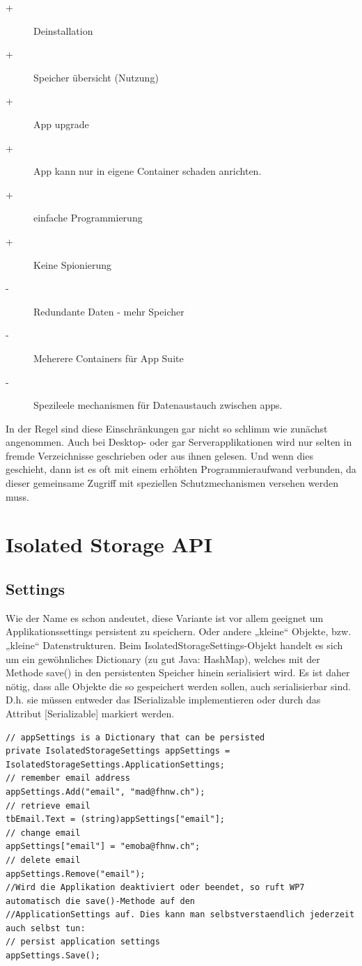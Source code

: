 \documentclass[a4paper,10pt]{scrreprt}
\begin{document}
\begin{description}
 \item [+] Deinstallation
 \item[+] Speicher übersicht (Nutzung)
 \item[+] App upgrade
 \item[+] App kann nur in eigene Container schaden anrichten.
 \item[+] einfache Programmierung
 \item[+] Keine Spionierung
 \item[-] Redundante Daten - mehr Speicher
 \item[-] Meherere Containers für App Suite
 \item[-] Spezileele mechanismen für Datenaustauch zwischen apps.
\end{description}

In der Regel sind diese Einschränkungen gar nicht so schlimm wie zunächst angenommen. Auch bei Desktop-
oder gar Serverapplikationen wird nur selten in fremde Verzeichnisse geschrieben oder aus ihnen gelesen. Und
wenn dies geschieht, dann ist es oft mit einem erhöhten Programmieraufwand verbunden, da dieser
gemeinsame Zugriff mit speziellen Schutzmechanismen versehen werden muss.


\section{Isolated Storage API}

\subsection{Settings}
Wie der Name es schon andeutet, diese Variante ist vor allem geeignet um Applikationssettings persistent zu
speichern. Oder andere „kleine“ Objekte, bzw. „kleine“ Datenstrukturen. Beim IsolatedStorageSettings-Objekt
handelt es sich um ein gewöhnliches Dictionary (zu gut Java: HashMap), welches mit der Methode save() in den
persistenten Speicher hinein serialisiert wird. Es ist daher nötig, dass alle Objekte die so gespeichert werden
sollen, auch serialisierbar sind. D.h. sie müssen entweder das ISerializable implementieren oder durch
das Attribut [Serializable] markiert werden.

\begin{lstlisting}[caption=Isolated Storage Settings]
// appSettings is a Dictionary that can be persisted
private IsolatedStorageSettings appSettings = IsolatedStorageSettings.ApplicationSettings;
// remember email address
appSettings.Add("email", "mad@fhnw.ch");
// retrieve email
tbEmail.Text = (string)appSettings["email"];
// change email
appSettings["email"] = "emoba@fhnw.ch";
// delete email
appSettings.Remove("email");
//Wird die Applikation deaktiviert oder beendet, so ruft WP7 automatisch die save()-Methode auf den
//ApplicationSettings auf. Dies kann man selbstverstaendlich jederzeit auch selbst tun:
// persist application settings
appSettings.Save();
\end{lstlisting}
\end{document}
